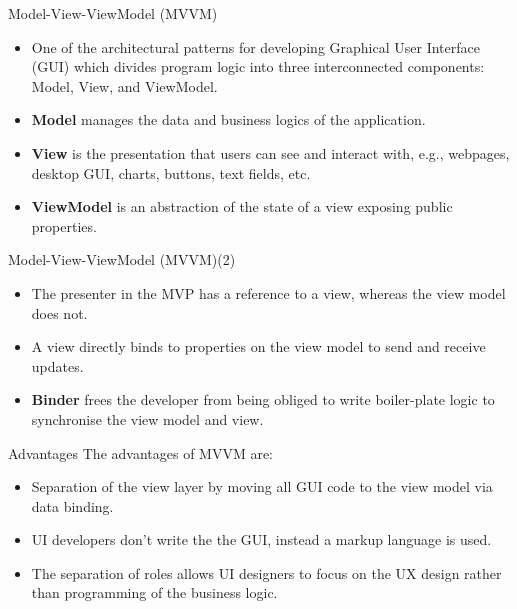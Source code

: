 \documentclass[aspectratio=169, table]{beamer}
\begin{document}
	
	\begin{frame}{Model-View-ViewModel (MVVM) }
		\begin{itemize}
			\item One of the architectural patterns for developing Graphical User Interface (GUI) which divides program logic into three interconnected components: Model, View, and ViewModel.
			\item \textbf{Model} manages the data and business logics of the application.
			\item \textbf{View} is the presentation that users can see and interact with, e.g., webpages, desktop GUI, charts, buttons, text fields, etc.
			\item \textbf{ViewModel} is an abstraction of the state of a view exposing public properties. 
		
			
		\end{itemize}
	\end{frame}


	\begin{frame}{Model-View-ViewModel (MVVM)(2)}
		\begin{itemize}
			\item The presenter in the MVP has a reference to a view, whereas the view model does not. 
			\item A view directly binds to properties on the view model to send and receive updates.
			\item \textbf{Binder} frees the developer from being obliged to write boiler-plate logic to synchronise the view model and view.  
			
		\end{itemize}
	\end{frame}
		
	
	\begin{frame}{Advantages}
		The advantages of MVVM are:
		\begin{itemize}
			\item Separation of the view layer by moving all GUI code to the view model via data binding.
			\item UI developers don't write the the GUI, instead a markup language is used.
			\item The separation of roles allows UI designers to focus on the UX design rather than programming of the business logic. 
		
			
		\end{itemize}
	\end{frame}
	
\end{document}

